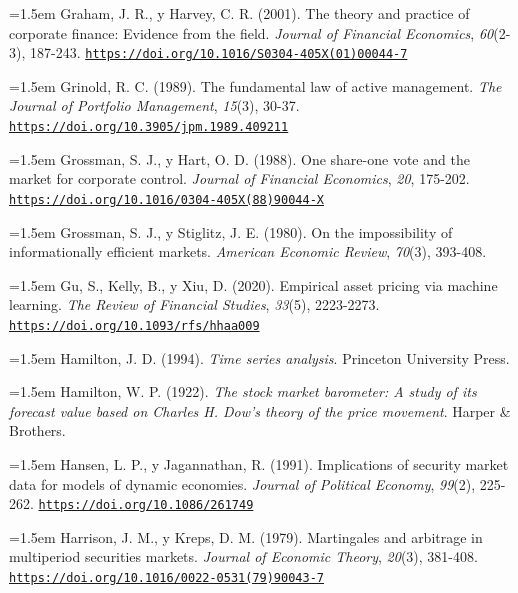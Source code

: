 \documentclass[10pt,a4paper]{article}
\begin{document}
\noindent\hangindent=1.5em Graham, J. R., y Harvey, C. R. (2001). The theory and practice of corporate finance: Evidence from the field. \textit{Journal of Financial Economics}, \textit{60}(2-3), 187-243. \href{https://doi.org/10.1016/S0304-405X(01)00044-7}{\nolinkurl{https://doi.org/10.1016/S0304-405X(01)00044-7}}

\noindent\hangindent=1.5em Grinold, R. C. (1989). The fundamental law of active management. \textit{The Journal of Portfolio Management}, \textit{15}(3), 30-37. \href{https://doi.org/10.3905/jpm.1989.409211}{\nolinkurl{https://doi.org/10.3905/jpm.1989.409211}}

\noindent\hangindent=1.5em Grossman, S. J., y Hart, O. D. (1988). One share-one vote and the market for corporate control. \textit{Journal of Financial Economics}, \textit{20}, 175-202. \href{https://doi.org/10.1016/0304-405X(88)90044-X}{\nolinkurl{https://doi.org/10.1016/0304-405X(88)90044-X}}

\noindent\hangindent=1.5em Grossman, S. J., y Stiglitz, J. E. (1980). On the impossibility of informationally efficient markets. \textit{American Economic Review}, \textit{70}(3), 393-408.

\noindent\hangindent=1.5em Gu, S., Kelly, B., y Xiu, D. (2020). Empirical asset pricing via machine learning. \textit{The Review of Financial Studies}, \textit{33}(5), 2223-2273. \href{https://doi.org/10.1093/rfs/hhaa009}{\nolinkurl{https://doi.org/10.1093/rfs/hhaa009}}

\noindent\hangindent=1.5em Hamilton, J. D. (1994). \textit{Time series analysis}. Princeton University Press.

\noindent\hangindent=1.5em Hamilton, W. P. (1922). \textit{The stock market barometer: A study of its forecast value based on Charles H. Dow's theory of the price movement}. Harper \& Brothers.

\noindent\hangindent=1.5em Hansen, L. P., y Jagannathan, R. (1991). Implications of security market data for models of dynamic economies. \textit{Journal of Political Economy}, \textit{99}(2), 225-262. \href{https://doi.org/10.1086/261749}{\nolinkurl{https://doi.org/10.1086/261749}}

\noindent\hangindent=1.5em Harrison, J. M., y Kreps, D. M. (1979). Martingales and arbitrage in multiperiod securities markets. \textit{Journal of Economic Theory}, \textit{20}(3), 381-408. \href{https://doi.org/10.1016/0022-0531(79)90043-7}{\nolinkurl{https://doi.org/10.1016/0022-0531(79)90043-7}}
\end{document}
